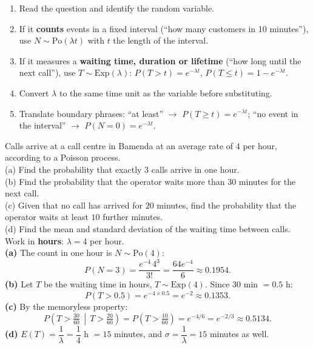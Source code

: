\documentclass[11pt]{article}
\begin{document}
\begin{methode}
\begin{enumerate}
\item Read the question and identify the random variable.
\item If it \textbf{counts} events in a fixed interval (``how many customers in 10 minutes''), use $N \sim \mathrm{Po}(\lambda t)$ with $t$ the length of the interval.
\item If it measures a \textbf{waiting time, duration or lifetime} (``how long until the next call''), use $T \sim \mathrm{Exp}(\lambda)$: $P(T > t) = e^{-\lambda t}$, $P(T \leq t) = 1 - e^{-\lambda t}$.
\item Convert $\lambda$ to the same time unit as the variable before substituting.
\item Translate boundary phrases: ``at least'' $\to$ $P(T \geq t) = e^{-\lambda t}$; ``no event in the interval'' $\to$ $P(N = 0) = e^{-\lambda t}$.
\end{enumerate}
\end{methode}

\begin{exoresolu}
Calls arrive at a call centre in Bamenda at an average rate of $4$ per hour, according to a Poisson process.\\
(a) Find the probability that exactly $3$ calls arrive in one hour.\\
(b) Find the probability that the operator waits more than $30$ minutes for the next call.\\
(c) Given that no call has arrived for $20$ minutes, find the probability that the operator waits at least $10$ further minutes.\\
(d) Find the mean and standard deviation of the waiting time between calls.
\tcblower
Work in \textbf{hours}: $\lambda = 4$ per hour.\\
\textbf{(a)} The count in one hour is $N \sim \mathrm{Po}(4)$:
\[
P(N = 3) = \frac{e^{-4}\,4^3}{3!} = \frac{64e^{-4}}{6} \approx 0.1954.
\]
\textbf{(b)} Let $T$ be the waiting time in hours, $T \sim \mathrm{Exp}(4)$. Since $30$ min $= 0.5$ h:
\[
P(T > 0.5) = e^{-4 \times 0.5} = e^{-2} \approx 0.1353.
\]
\textbf{(c)} By the memoryless property:
\[
P\!\left(T > \tfrac{30}{60} \,\middle|\, T > \tfrac{20}{60}\right) = P\!\left(T > \tfrac{10}{60}\right) = e^{-4/6} = e^{-2/3} \approx 0.5134.
\]
\textbf{(d)} $E(T) = \dfrac{1}{\lambda} = \dfrac{1}{4}$ h $= 15$ minutes, and $\sigma = \dfrac{1}{\lambda} = 15$ minutes as well.
\end{exoresolu}
\end{document}

